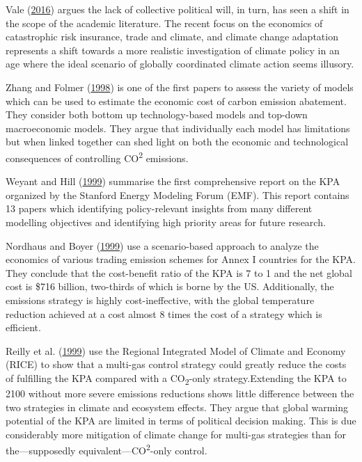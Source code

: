 \documentclass[12pt,]{article}
\begin{document}
Vale (\protect\hyperlink{ref-Vale2016}{2016}) argues the lack of collective political will, in turn, has seen a shift in the scope of the academic literature. The recent focus on the economics of catastrophic risk insurance, trade and climate, and climate change adaptation represents a shift towards a more realistic investigation of climate policy in an age where the ideal scenario of globally coordinated climate action seems illusory.

Zhang and Folmer (\protect\hyperlink{ref-Zhang1998}{1998}) is one of the first papers to assess the variety of models which can be used to estimate the economic cost of carbon emission abatement. They consider both bottom up technology-based models and top-down macroeconomic models. They argue that individually each model has limitations but when linked together can shed light on both the economic and technological consequences of controlling CO\textsuperscript{2} emissions.

Weyant and Hill (\protect\hyperlink{ref-Weyant1999}{1999}) summarise the first comprehensive report on the KPA organized by the Stanford Energy Modeling Forum (EMF). This report contains 13 papers which identifying policy-relevant insights from many different modelling objectives and identifying high priority areas for future research.

Nordhaus and Boyer (\protect\hyperlink{ref-Nordhaus1999}{1999}) use a scenario-based approach to analyze the economics of various trading emission schemes for Annex I countries for the KPA. They conclude that the cost-benefit ratio of the KPA is 7 to 1 and the net global cost is \$716 billion, two-thirds of which is borne by the US. Additionally, the emissions strategy is highly cost-ineffective, with the global temperature reduction achieved at a cost almost 8 times the cost of a strategy which is efficient.

Reilly et al. (\protect\hyperlink{ref-Reilly1999}{1999}) use the Regional Integrated Model of Climate and Economy (RICE) to show that a multi-gas control strategy could greatly reduce the costs of fulfilling the KPA compared with a CO\textsubscript{2}-only strategy.Extending the KPA to 2100 without more severe emissions reductions shows little difference between the two strategies in climate and ecosystem effects. They argue that global warming potential of the KPA are limited in terms of political decision making. This is due considerably more mitigation of climate change for multi-gas strategies than for the---supposedly equivalent---CO\textsuperscript{2}-only control.
\end{document}
